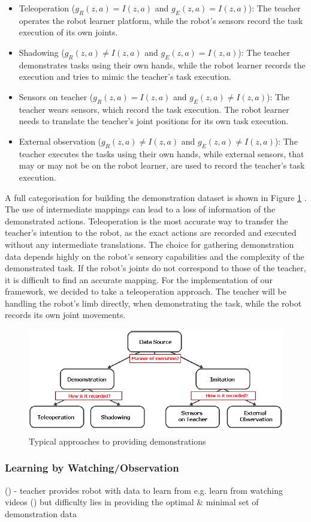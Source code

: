 \begin{itemize}
\item Teleoperation ($g_R(z,a) = I(z,a)$ and $g_E(z,a) = I(z,a)$): The teacher operates the robot learner platform, while the robot's sensors record the task execution of its own joints.
\item Shadowing ($g_R(z,a) \neq I(z,a)$ and $g_E(z,a) = I(z,a)$): The teacher demonstrates tasks using their own hands, while the robot learner records the execution and tries to mimic the teacher's task execution.
\item Sensors on teacher  ($g_R(z,a) = I(z,a)$ and $g_E(z,a) \neq I(z,a)$): The teacher wears sensors, which record the task execution. The robot learner needs to translate the teacher's joint positions for its own task execution.
\item External observation  ($g_R(z,a) \neq I(z,a)$ and $g_E(z,a) \neq I(z,a)$): The teacher executes the tasks using their own hands, while external sensors, that may or may not be on the robot learner, are used to record the teacher's task execution.
\end{itemize}

\noindent A full categorisation for building the demonstration dataset is shown in Figure \ref{fig:Gathering demonstrations2} \cite{argall2009survey}. The use of intermediate mappings can lead to a loss of information of the demonstrated actions. Teleoperation is the most accurate way to transfer the teacher's intention to the robot, as the exact actions are recorded and executed without any intermediate translations. The choice for gathering demonstration data depends highly on the robot's sensory capabilities and the complexity of the demonstrated task. If the robot's joints do not correspond to those of the teacher, it is difficult to find an accurate mapping. For the implementation of our framework, we decided to take a teleoperation approach. The teacher will be handling the robot's limb directly, when demonstrating the task, while the robot records its own joint movements.

  \begin{figure}[ht]
    \centering
    \includegraphics[scale=0.6]{figures/Gathering3}
    \caption{Typical approaches to providing demonstrations}
    \label{fig:Gathering demonstrations2}
  \end{figure}


\subsubsection{Learning by Watching/Observation}\label{sssec:LbObservation}
(\cite{kuniyoshi1994learning})
- teacher provides robot with data to learn from e.g. learn from watching videos (\cite{Yang2015})
but difficulty lies in providing the optimal \& minimal set of demonstration data

 